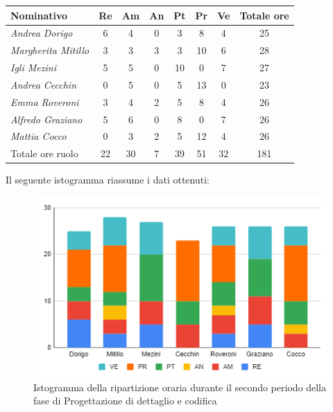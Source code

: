 {{{{{{{{{{{		\begin{center}
			\renewcommand{\arraystretch}{1.4}
			\begin{tabularx}{\textwidth}{|X|c|c|c|c|c|c|c|}
				\hline
				\rowcolor{airforceblue}
				\textbf{Nominativo} & \textbf{Re} & \textbf{Am} & \textbf{An} & \textbf{Pt} & \textbf{Pr} & \textbf{Ve} & \textbf{Totale ore}\\
				\hline
				\textit{Andrea Dorigo} & 6 & 4 & 0 & 3 & 8 & 4 & 25\\
				\hline
				\textit{Margherita Mitillo} & 3 & 3 & 3 & 3 & 10 & 6 & 28\\
				\hline
				\textit{Igli Mezini} & 5 & 5 & 0 & 10 & 0 & 7 & 27\\
				\hline
				\textit{Andrea Cecchin} & 0 & 5 & 0 & 5 & 13 & 0 & 23\\
				\hline
				\textit{Emma Roveroni} & 3 & 4 & 2 & 5 & 8 & 4 & 26\\
				\hline
				\textit{Alfredo Graziano} & 5 & 6 & 0 & 8 & 0 & 7 & 26\\
				\hline
				\textit{Mattia Cocco} & 0 & 3 & 2 & 5 & 12 & 4 & 26\\
				\hline
				Totale ore ruolo & 22 & 30 & 7 & 39 & 51 & 32 & 181\\
				\hline
			\end{tabularx}
		\end{center}
		Il seguente istogramma riassume i dati ottenuti:
		\begin{figure}[!h]
			\begin{center}
				\includegraphics[width=0.7\linewidth]{../immagini/pdp/istogramma_progettazione_dettaglio_periodo2.png}
				\caption{Istogramma della ripartizione oraria durante il secondo periodo della fase di Progettazione di
					dettaglio e codifica}
			\end{center}
		\end{figure}
		\clearpage
}}}}}}}}}}}
